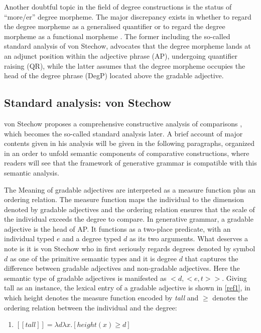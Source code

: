 \documentclass{ctexart}
\let \cite \parencite
\begin{document}
Another doubtful topic in the field of degree constructions is the status of “more/er” degree morpheme. The major discrepancy exists in whether to regard the degree morpheme as a generalised quantifier \cite{von1984a,heim1985,bhatt2004} or to regard the degree morpheme as a functional morpheme \cite{bierwisch1989,corver1990,corver1993,corver1997a,kennedy1997} . The former including the so-called standard analysis of von Stechow, advocates that the degree morpheme lands at an adjunct position within the adjective phrase (AP), undergoing quantifier raising (QR), while the latter assumes that the degree morpheme occupies the head of the degree phrase (DegP) located above the gradable adjective.

\subsection{Standard analysis: von Stechow}

\noindent
von Stechow proposes a comprehensive constructive analysis of comparisons \cite{von1984a}, which becomes the so-called standard analysis later\cite{bale2011}. A brief account of major contents given in his analysis will be given in the following paragraphs, organized in an order to unfold semantic components of comparative constructions, where readers will see that the framework of generative grammar is compatible with this semantic analysis.

The Meaning of gradable adjectives are interpreted as a measure function plus an ordering relation. The measure function maps the individual to the dimension denoted by gradable adjectives and the ordering relation ensures that the scale of the individual exceeds the degree to compare. In generative grammar, a gradable adjective is the head of AP. It functions as a two-place predicate, with an individual typed $e$ and a degree typed $d$ as its two arguments. What deserves a note is it is von Stechow who in first seriously regards degrees denoted by symbol $d$ as one of the primitive semantic types and it is degree $d$ that captures the difference between gradable adjectives and non-gradable adjectives. Here the semantic type of gradable adjectives is manifested as $<d,<e,t>>$. Giving tall as an instance, the lexical entry of a gradable adjective is shown in \ref{ref1}, in which height denotes the measure function encoded by \textit{tall} and $\geq$ denotes the ordering relation between the individual and the degree:

\begin{enumerate}
    \item \label{ref1} $[\![tall]\!] = \lambda d \lambda x. [height(x) \geq d]$
\end{enumerate}
\end{document}
